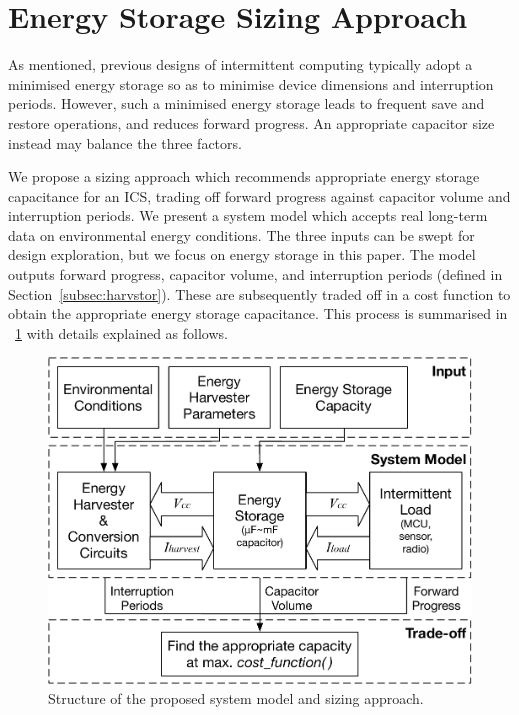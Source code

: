 \section{Energy Storage Sizing Approach} \label{sec:c4_approach}

As mentioned, previous designs of intermittent computing typically adopt a minimised energy storage so as to minimise device dimensions and interruption periods. 
However, such a minimised energy storage leads to frequent save and restore operations, and reduces forward progress.
An appropriate capacitor size instead may balance the three factors. 

We propose a sizing approach which recommends appropriate energy storage capacitance for an ICS, trading off forward progress against capacitor volume and interruption periods. 
We present a system model which accepts real long-term data on environmental energy conditions. 
The three inputs can be swept for design exploration, but we focus on energy storage in this paper. 
The model outputs forward progress, capacitor volume, and interruption periods (defined in Section~\ref{subsec:harvstor}). 
These are subsequently traded off in a cost function to obtain the appropriate energy storage capacitance. 
This process is summarised in \figurename{~\ref{fig:sizingapproach}} with details explained as follows. 

\begin{figure}[!t]
    \centering
    \includegraphics[width=\columnwidth]{ch4_sizingapproach/figures/mdlfrw4}
    \caption{Structure of the proposed system model and sizing approach.}
    \label{fig:sizingapproach}
\end{figure}


